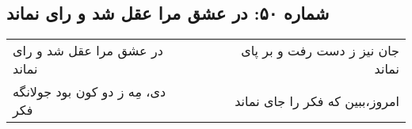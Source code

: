 \begin{center}
\section*{شماره ۵۰: در عشق مرا عقل شد و رای نماند}
\label{sec:050}
\begin{longtable}{l p{0.5cm} r}
در عشق مرا عقل شد و رای نماند
&&
جان نیز ز دست رفت و بر پای نماند
\\
دی، مِه ز دو کون بود جولانگه فکر
&&
امروز،‌ببین که فکر را جای نماند
\\
\end{longtable}
\end{center}
